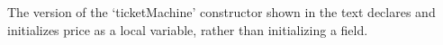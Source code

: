 The version of the `ticketMachine' constructor shown in the text
declares and initializes price as a local variable, rather than
initializing a field.
